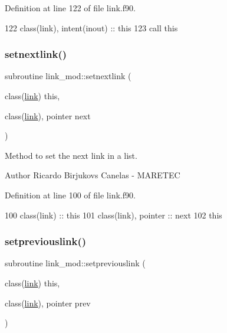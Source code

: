 Definition at line 122 of file link.\+f90.


\begin{DoxyCode}
122     \textcolor{keywordtype}{class}(link), \textcolor{keywordtype}{intent(inout)} :: this
123     \textcolor{keyword}{call }this%
\end{DoxyCode}
\mbox{\label{namespacelink__mod_a0dd2fe581e8d566faf03fc7ebd2f8524}} 
\subsubsection{\texorpdfstring{setnextlink()}{setnextlink()}}
{\footnotesize\ttfamily subroutine link\+\_\+mod\+::setnextlink (\begin{DoxyParamCaption}\item[{class(\mbox{\hyperlink{structlink__mod_1_1link}{link}})}]{this,  }\item[{class(\mbox{\hyperlink{structlink__mod_1_1link}{link}}), pointer}]{next }\end{DoxyParamCaption})\hspace{0.3cm}{\ttfamily [private]}}



Method to set the next link in a list. 

\begin{DoxyAuthor}{Author}
Ricardo Birjukovs Canelas -\/ M\+A\+R\+E\+T\+EC 
\end{DoxyAuthor}


Definition at line 100 of file link.\+f90.


\begin{DoxyCode}
100     \textcolor{keywordtype}{class}(link) :: this
101     \textcolor{keywordtype}{class}(link), \textcolor{keywordtype}{pointer} :: next
102     this%
\end{DoxyCode}
\mbox{\label{namespacelink__mod_ad0d413cb7907fdcf6561639cdd03481a}} 
\subsubsection{\texorpdfstring{setpreviouslink()}{setpreviouslink()}}
{\footnotesize\ttfamily subroutine link\+\_\+mod\+::setpreviouslink (\begin{DoxyParamCaption}\item[{class(\mbox{\hyperlink{structlink__mod_1_1link}{link}})}]{this,  }\item[{class(\mbox{\hyperlink{structlink__mod_1_1link}{link}}), pointer}]{prev }\end{DoxyParamCaption})\hspace{0.3cm}{\ttfamily [private]}}



